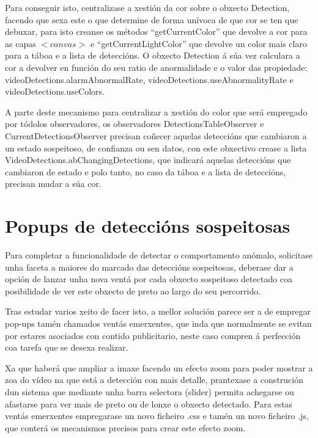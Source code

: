     Para conseguir isto, centralizase a xestión da cor sobre o obxecto Detection, facendo que sexa 
    este o que determine de forma unívoca de que cor se ten que debuxar, para isto creanse os 
    métodos ``getCurrentColor'' que devolve a cor para as capas $<canvas>$ e 
    ``getCurrentLightColor'' que devolve un color mais claro para a táboa e a lista de deteccións.
    O obxecto Detection á súa vez calculara a cor a devolver en función do seu ratio de anormalidade
    e o valor das propiedade: videoDetections.alarmAbnormalRate, videoDetections.useAbnormalityRate
    e videoDetections.useColors.
    
    A parte deste mecanismo para centralizar a xestión do color que será empregado por tódolos 
    observadores, os observadores DetectionsTableObserver e CurrentDetectionsObserver precisan 
    coñecer aquelas deteccións que cambiaron a un estado sospeitoso, de confianza ou sen datos,
    con este obxectivo crease a lista VideoDetections.abChangingDetections, que indicará aquelas
    deteccións que cambiaron de estado e polo tanto, no caso da táboa e a lista de deteccións, 
    precisan mudar a súa cor.
    

\section{Popups de deteccións sospeitosas}

    Para completar a funcionalidade de detectar o comportamento anómalo, solicitase unha faceta a 
    maiores do marcado das deteccións sospeitosas, deberase dar a opción de lanzar unha nova ventá
    por cada obxecto sospeitoso detectado coa posibilidade de ver este obxecto de preto ao largo do
    seu percorrido.
    
    Tras estudar varios xeito de facer isto, a mellor solución parece ser a de empregar pop-ups 
    tamén chamados ventás emerxentes, que inda que normalmente se evitan por estares asociados 
    con contido publicitario, neste caso compren á perfección coa tarefa que se desexa realizar.
    
    Xa que haberá que ampliar a imaxe facendo un efecto zoom para poder mostrar a zoa do vídeo na
    que está a detección con mais detalle, prantexase a construción dun sistema que mediante unha
    barra selectora (slider) permita achegarse ou afastarse para ver mais de preto ou de lonxe o 
    obxecto detectado. Para estas ventás emerxentes empregarase un novo ficheiro .css e tamén un 
    novo ficheiro .js, que conterá os mecanismos precisos para crear este efecto zoom.
    
